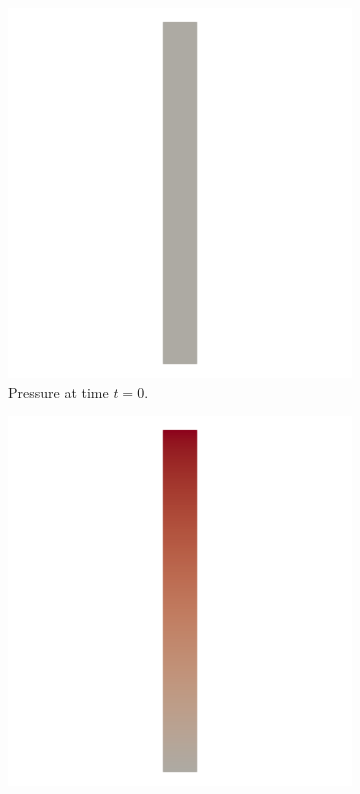 \documentclass[a4paper,11pt,openright,twoside]{book}
\begin{document}
\begin{figure}[h!] 
  \begin{subfigure}[b]{0.5\linewidth}
    \centering
    \includegraphics[width=1.2\linewidth]{images/pressure_fixed_0.png} 
        \centering
    \caption{Pressure at time $t = 0$.} 
    \label{fig4:a} 
    \vspace{4ex}
  \end{subfigure}%
  \begin{subfigure}[b]{0.5\linewidth}
    \centering
    \includegraphics[width=1.2\linewidth]{images/pressure_fixed_025.png}

\end{subfigure}
\end{figure}
\end{document}
